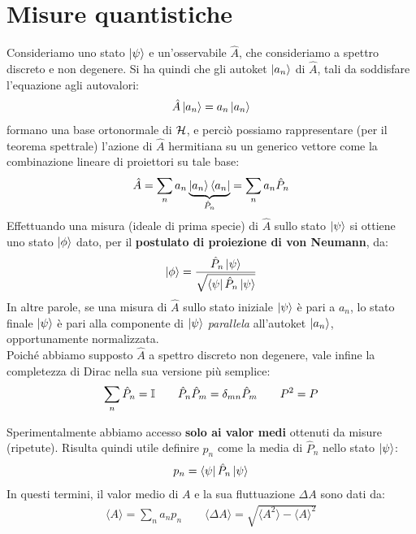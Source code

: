 \documentclass[../../InformazioneQuantistica.tex]{subfiles}
\begin{document}
\section{Misure quantistiche}
Consideriamo uno stato $\Ket{\psi}$ e un'osservabile $\hat{A}$, che consideriamo a spettro discreto e non degenere. Si ha quindi che gli autoket $\Ket{a_n}$ di $\hat{A}$, tali da soddisfare l'equazione agli autovalori:
\begin{align*}
\hat{A}\Ket{a_n} = a_n \Ket{a_n}
\end{align*}
formano una base ortonormale di $\mathcal{H}$, e perciò possiamo rappresentare (per il teorema spettrale) l'azione di $\hat{A}$ hermitiana su un generico vettore come la combinazione lineare di proiettori su tale base:
\begin{align*}
\hat{A} = \sum_n a_n \underbrace{\Ket{a_n}\Bra{a_n}}_{\hat{P}_n} = \sum_n a_n \hat{P}_n
\end{align*}
Effettuando una misura (ideale di prima specie) di $\hat{A}$ sullo stato $\Ket{\psi}$ si ottiene uno stato $\Ket{\phi}$ dato, per il \textbf{postulato di proiezione di von Neumann}, da:
\begin{align*}
\Ket{\phi} = \frac{\hat{P}_n \Ket{\psi}}{\sqrt{\Bra{\psi}\hat{P}_n \Ket{\psi}}}
\end{align*}
In altre parole, se una misura di $\hat{A}$ sullo stato iniziale $\Ket{\psi}$ è pari a $a_n$, lo stato finale $\Ket{\psi}$ è pari alla componente di $\Ket{\psi}$ \textit{parallela} all'autoket $\Ket{a_n}$, opportunamente normalizzata.\\

Poiché abbiamo supposto $\hat{A}$ a spettro discreto non degenere, vale infine la completezza di Dirac nella sua versione più semplice:
\begin{align*}
\sum_n \hat{P}_n = \mathbb{I} \qquad \hat{P}_n \hat{P}_m = \delta_{mn}\hat{P}_m \qquad P^2 = P
\end{align*}

Sperimentalmente abbiamo accesso \textbf{solo ai valor medi} ottenuti da misure (ripetute). Risulta quindi utile definire $p_n$ come la media di $\hat{P}_n$ nello stato $\Ket{\psi}$:
\begin{align*}
p_n = \Bra{\psi}\hat{P}_n \Ket{\psi}
\end{align*}
In questi termini, il valor medio di $A$ e la sua fluttuazione $\Delta A$ sono dati da:
\begin{align*}
\langle A \rangle = \sum_n a_n p_n \qquad \langle \Delta A \rangle =
\sqrt{\langle A^2 \rangle - \langle A\rangle^2}
\end{align*}
\end{document}
